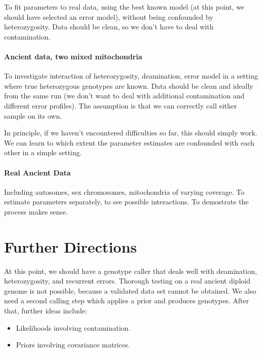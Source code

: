 \documentclass{article}
\begin{document}
To fit parameters to real data, using the best known model (at this
point, we should have selected an error model), without being confounded
by heterozygosity.  Data should be clean, so we don't have to deal with
contamination.


\paragraph{Ancient data, two mixed mitochondria}

To investigate interaction of heterozygosity, deamination, error model
in a setting where true heterozygous genotypes are known.  Data should
be clean and ideally from the same run (we don't want to deal with
additional contamination and different error profiles).  The assumption
is that we can correctly call either sample on its own.

In principle, if we haven't encountered difficulties so far, this should
simply work.  We can learn to which extent the parameter estimates are
confounded with each other in a simple setting.

\paragraph{Real Ancient Data}

Including autosomes, sex chromosomes, mitochondria of
varying coverage.  To estimate parameters separately, to see possible
interactions.  To demostrate the process makes sense. 


\section{Further Directions}

At this point, we should have a genotype caller that deals well with
deamination, heterozygosity, and recurrent errors.  Thorough testing on
a real ancient diploid genome is not possible, because a validated data
set cannot be obtained.  We also need a second calling step which
applies a prior and produces genotypes.  After that, further ideas
include: 

\begin{itemize}
\item Likelihoods involving contamination.
\item Priors involving covariance matrices.
\end{itemize}
\end{document}
